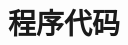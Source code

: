 
\appendix
\backmatter
\cleardoublepage
\pagestyle{appendixpage}
\renewcommand{\chapterlabel}{\appendixname} %


\chapter{程序代码}
\begin{spacing}{1.0}
  
\end{spacing}




